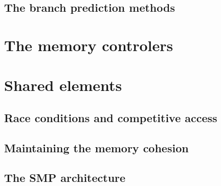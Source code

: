\subsection{The branch prediction methods}

\section{The memory controlers}

\section{Shared elements}

\subsection{Race conditions and competitive access}

\subsection{Maintaining the memory cohesion}

\subsection{The SMP architecture}
